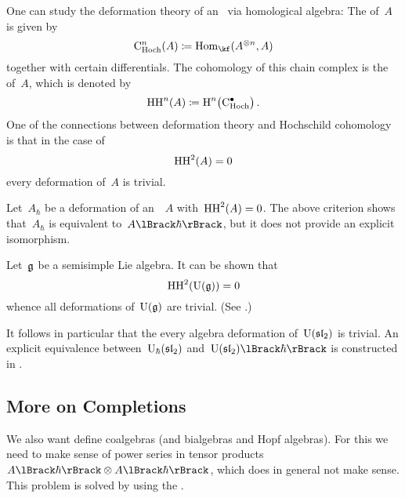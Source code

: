 \documentclass[a4paper, 11pt, oneside]{scrartcl}
\begin{document}
\begin{remark}
  One can study the deformation theory of an~\algebra{$\kf$} via homological algebra:
  The  of~$A$ is given by
  \[
    \CHoch^n(A)
    \defined
    \Hom_{\kf}(A^{\tensor n}, A)
  \]
  together with certain differentials.
  The cohomology of this chain complex is the  of~$A$, which is denoted by
  \[
    \HH^n(A)
    \defined
    \Homology^n\bigl( \CHoch^\bullet \bigr) \,.
  \]
  One of the connections between deformation theory and Hochschild cohomology is that in the case of
  \[
    \operatorname{HH}^2(A) = 0
  \]
  every deformation of~$A$ is trivial.
\end{remark}

\begin{warning}
  Let~$A_\hbar$ be a deformation of an~\algebra{$\kf$}~$A$ with~$\operatorname{HH}^2(A) = 0$.
  The above criterion shows that~$A_\hbar$ is equivalent to~$\power{A}{\hbar}$, but it does not provide an explicit isomorphism.
\end{warning}

\begin{example}
  Let~$\mathfrak{g}$ be a semisimple Lie algebra.
  It can be shown that
  \[
    \operatorname{HH}^2( \operatorname{U}(\mathfrak{g}) ) = 0
  \]
  whence all deformations of~$\operatorname{U}(\mathfrak{g})$ are trivial.
  (See \cite[Theorem~2]{gerstenhaber_quantum}.)

  It follows in particular that the every algebra deformation of~$\operatorname{U}(\mathfrak{sl}_2)$ is trivial.
  An explicit equivalence between~$\operatorname{U}_{\hbar}(\mathfrak{sl}_2)$ and~$\power{\Univ(\sllie_2)}{\hbar}$ is constructed in \cite[Proposition~4.6.4]{guide_to_quantum_groups}.
\end{example}





\subsection{More on Completions}

We also want define coalgebras (and bialgebras and Hopf algebras).
For this we need to make sense of power series in tensor products~$\power{A}{\hbar} \tensor \power{A}{\hbar}$, which does in general not make sense.
This problem is solved by using the .
\end{document}
